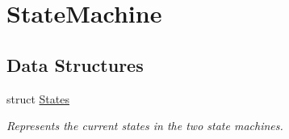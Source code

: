 \hypertarget{group___state_machine}{}\section{State\+Machine}
\label{group___state_machine}
\subsection*{Data Structures}
\begin{DoxyCompactItemize}
\item 
struct \hyperlink{struct_states}{States}
\begin{DoxyCompactList}\small\item\em Represents the current states in the two state machines. \end{DoxyCompactList}\end{DoxyCompactItemize}
